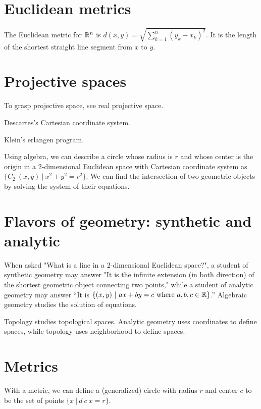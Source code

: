 \section{Euclidean metrics}

The Euclidean metric for \(\mathbb{R}^n\) is
\(
    d(x,y) = \sqrt{\sum_{k=1}^n (y_k-x_k)^2}
\).
It is the length of the shortest straight line segment from \(x\) to \(y\).

\section{Projective spaces}

To grasp projective space, see real projective space.

Descartes's Cartesian coordinate system.

Klein's erlangen program.

Using algebra, we can describe a circle whose radius is $r$
and whose center is the origin in a 2-dimensional Euclidean space with Cartesian coordinate system
as $\{C_2~(x,y) ~|~ x^2+y^2 = r^2\}$.
We can find the intersection of two geometric objects
by solving the system of their equations.

\section{Flavors of geometry: synthetic and analytic}

When asked "What is a line in a 2-dimensional Euclidean space?",
a student of
synthetic geometry
may answer "It is the infinite extension (in both direction)
of the shortest geometric object connecting two points,"
while a student of
analytic geometry
may answer
``It is $\{ (x,y) ~|~ ax+by=c \text{ where } a,b,c\in\mathbb{R} \}$.''
Algebraic geometry studies the solution of equations.

Topology studies topological spaces.
Analytic geometry uses coordinates to define spaces,
while topology uses neighborhood to define spaces.

\section{Metrics}

With a metric, we can define
a (generalized) circle with radius $r$ and center $c$
to be the set of points
$\{x ~|~ d~c~x = r \}$.

